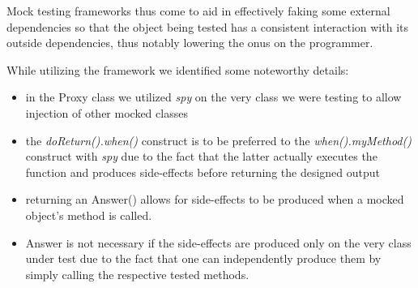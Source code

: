 \documentclass{beamer}
\begin{document}
Mock testing frameworks thus come to aid in effectively faking some external dependencies so that the object being tested has a consistent interaction with its outside dependencies, thus notably lowering the onus on the programmer.

While utilizing the framework we identified some noteworthy details:
\begin{itemize}
	\item in the Proxy class we utilized \textit{spy} on the very class we were testing to allow injection of other mocked classes
	\item the \textit{doReturn().when()} construct is to be preferred to the \textit{when().myMethod()} construct with \textit{spy} due to the fact that the latter actually executes the function and produces side-effects before returning the designed output
	\item returning an Answer() allows for side-effects to be produced when a mocked object's method is called. 
	\item Answer is not necessary if the side-effects are produced only on the very class under test due to the fact that one can independently produce them by simply calling the respective tested methods.
\end{itemize}
\end{document}
